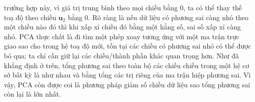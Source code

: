 trường hợp này, vì giá trị trung bình theo mọi chiều bằng 0, ta có thể thay thế
toạ độ theo chiều $\mathbf{u}_2$ bằng 0. Rõ ràng là nếu dữ liệu có phương sai
càng nhỏ theo một chiều nào đó thì khi xấp xỉ chiều đó bằng một hằng số, sai số
xấp xỉ càng nhỏ. PCA thực chất là đi tìm một phép xoay tương ứng với một ma trận
trực giao sao cho trong hệ toạ độ mới, tồn tại các chiều có phương sai nhỏ
có thể được bỏ qua; ta chỉ cần giữ lại các chiều/thành phần khác quan trọng hơn. Như
đã khẳng định ở trên, tổng phương sai theo toàn bộ các chiều chiều trong một hệ cơ sở bất kỳ là
như nhau và bằng tổng các trị riêng của ma trận hiệp phương sai. Vì vậy, PCA còn
được coi là phương pháp giảm số chiều dữ liệu sao tổng phương sai còn lại là lớn
nhất.







